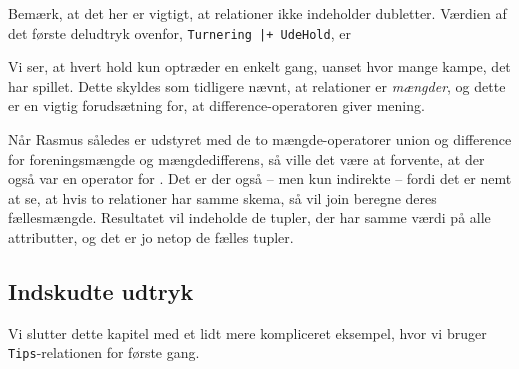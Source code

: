 
Bem\ae{}rk, at det her er vigtigt, at relationer ikke indeholder dubletter.
V\ae{}rdien af det f\o{}rste deludtryk ovenfor,
\verb"Turnering |+ UdeHold", er
\begin{center}
\end{center}
Vi ser, at hvert hold kun optr\ae{}der en enkelt gang, uanset hvor mange
kampe, det har spillet. Dette skyldes som tidligere n\ae{}vnt, at
relationer er {\em m\ae{}ngder}, og dette er en vigtig foruds\ae{}tning
for, at difference-operatoren giver mening.

N\aa{}r {\sc Rasmus} s\aa{}ledes er udstyret med de to m\ae{}ngde-operatorer
union og difference for foreningsm\ae{}ngde og m\ae{}ngdedifferens, s\aa{}
ville det v\ae{}re at forvente, at der ogs\aa{} var en operator for
. Det er der ogs\aa{} -- men kun indirekte -- fordi
det er nemt at se, at hvis to relationer har samme skema, s\aa{} vil
join beregne deres f\ae{}llesm\ae{}ngde. Resultatet vil indeholde
de tupler, der har samme v\ae{}rdi p\aa{} alle attributter, og det er jo
netop de f\ae{}lles tupler.

\subsection{Indskudte udtryk}
Vi slutter dette kapitel med et lidt mere kompliceret eksempel, hvor
vi bruger \verb"Tips"-relationen for f\o{}rste gang.


